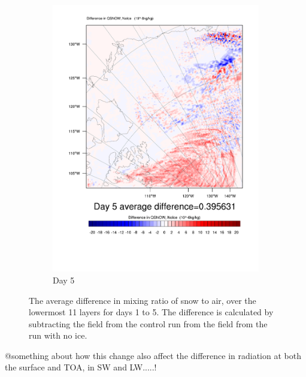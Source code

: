\begin{figure}
\begin{subfigure}{0.32\textwidth}
		\includegraphics[width=\textwidth]{results/noice/diff_NoIce_qsnow_Day5.pdf}
		\caption{Day 5}
		\label{subfig:snowstory_Day5}
	\end{subfigure}
\caption{The average difference in mixing ratio of snow to air, over the lowermost 11 layers for days 1 to 5. The difference is calculated by subtracting the field from the control run from the field from the run with no ice.}
\label{fig:snowstory}
\end{figure}
@something about how this change also affect the difference in radiation at both the surface and TOA, in SW and LW.....!

